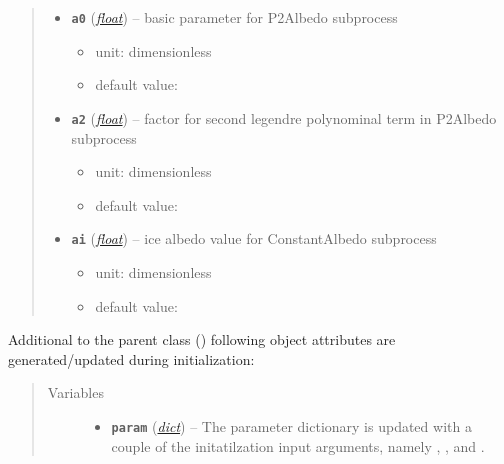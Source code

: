 \documentclass[a4paper,10pt,english]{sphinxmanual}
\begin{document}
\begin{fulllineitems}
\begin{quote}
\begin{description}
\begin{itemize}
\begin{itemize}
\end{itemize}


\item {} 
\textbf{\texttt{a0}} (\href{http://docs.python.org/2.7/library/functions.html\#float}{\emph{float}}) -- 
basic parameter for P2Albedo subprocess
\begin{itemize}
\item {} 
unit: dimensionless

\item {} 
default value: 

\end{itemize}


\item {} 
\textbf{\texttt{a2}} (\href{http://docs.python.org/2.7/library/functions.html\#float}{\emph{float}}) -- 
factor for second legendre polynominal term in P2Albedo subprocess
\begin{itemize}
\item {} 
unit: dimensionless

\item {} 
default value: 

\end{itemize}


\item {} 
\textbf{\texttt{ai}} (\href{http://docs.python.org/2.7/library/functions.html\#float}{\emph{float}}) -- 
ice albedo value for ConstantAlbedo subprocess
\begin{itemize}
\item {} 
unit: dimensionless

\item {} 
default value: 

\end{itemize}


\end{itemize}

\end{description}\end{quote}

Additional to the parent class 
{\hyperref[api/climlab.process:climlab.process.diagnostic.DiagnosticProcess]{\emph{}}} ()
following object attributes are generated/updated during initialization:
\begin{quote}\begin{description}
\item[{Variables}] \leavevmode\begin{itemize}
\item {} 
\textbf{\texttt{param}} (\href{http://docs.python.org/2.7/library/stdtypes.html\#dict}{\emph{dict}}) -- The parameter dictionary is updated with 
a couple of the initatilzation input 
arguments, namely , , 
 and .


\end{itemize}
\end{description}
\end{quote}
\end{fulllineitems}
\end{document}
